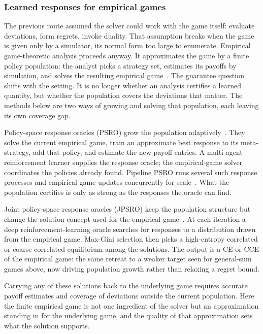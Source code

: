 \subsubsection{Learned responses for empirical games}
The previous route assumed the solver could work with the game itself: evaluate deviations, form regrets,
invoke duality. That assumption breaks when the game is
given only by a simulator, its normal form too large to enumerate. Empirical
game-theoretic analysis proceeds anyway. It approximates the game by a finite policy
population: the analyst picks a strategy set, estimates its payoffs by simulation,
and solves the resulting empirical game~\citep{WellmanTuylsGreenwald2025}. The
guarantee question shifts with the setting. It is no longer whether an analysis
certifies a learned quantity, but whether the population covers the deviations that
matter. The methods below are two ways of growing and solving that population, each
leaving its own coverage gap.

 Policy-space response oracles (PSRO) grow the
population adaptively~\citep{Lanctot2017}. They solve the current empirical game,
train an approximate best response to its meta-strategy, add that policy, and
estimate the new payoff entries. A multi-agent reinforcement learner supplies the
response oracle; the empirical-game solver coordinates the policies already found.
Pipeline PSRO runs several such response processes and empirical-game updates
concurrently for scale~\citep{McAleerPipelinePSRO2020}. What the population certifies
is only as strong as the responses the oracle can find.

 Joint policy-space response oracles
(JPSRO) keep the population structure but change the solution concept used for the
empirical game~\citep{Marris2021}. At each iteration a deep reinforcement-learning oracle
searches for responses to a distribution drawn from the empirical game. Max-Gini
selection then picks a high-entropy correlated or coarse correlated equilibrium
among the solutions. The output is a CE or CCE of the empirical game: the same retreat to a weaker
target seen for general-sum games above, now driving population
growth rather than relaxing a regret bound.

Carrying any of these solutions back to the underlying game requires accurate payoff
estimates and coverage of deviations outside the current population. Here the finite
empirical game is not one ingredient of the solver but an approximation standing in
for the underlying game, and the quality of that approximation sets what the solution
supports.

